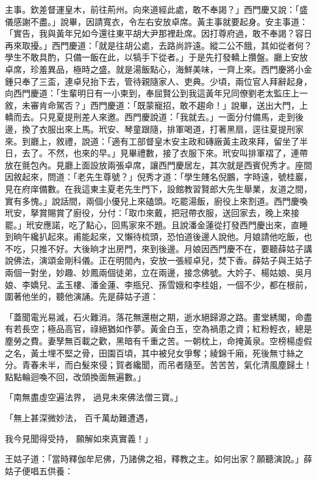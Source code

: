 \begin{showcontents}{}
主事。欽差督運皇木，前往荊州。向來道經此處，敢不奉謁？」西門慶又說：「盛儀感謝不盡。」說畢，因請寬衣，令左右安放卓席。黃主事就要起身。安主事道：「實告，我與黃年兄如今還往東平胡大尹那裡赴席。因打尊府過，敢不奉謁？容日再來取擾。」西門慶道：「就是往胡公處，去路尚許遠。縱二公不餓，其如從者何？學生不敢具酌，只備一飯在此，以犒手下從者。」于是先打發轎上攢盤。廳上安放卓席，珍羞異品，極時之盛。就是湯飯點心，海鮮美味，一齊上來。西門慶將小金鍾只奉了三盃，連卓兒抬下去，管待親隨家人、吏典。少頃，兩位官人拜辭起身，向西門慶道：「生輩明日有一小柬到，奉屈賢公到我這黃年兄同僚劉老太監庄上一敘，未審肯命駕否？」西門慶道：「既蒙寵招，敢不趨命！」說畢，送出大門，上轎而去。只見夏提刑差人來邀。西門慶說道：「我就去。」一面分付備馬，走到後邊，換了衣服出來上馬。玳安、琴童跟隨，排軍喝道，打著黑扇，逕往夏提刑家來。到廳上，敘禮，說道：「適有工部督皇木安主政和磚廠黃主政來拜，留坐了半日，去了。不然，也來的早。」見畢禮數，接了衣服下來。玳安叫排軍褶了，連帶放在氈包內。見廳上面設放兩張卓席，讓西門慶居左，其次就是西賓倪秀才。座間因敘起來，問道：「老先生尊號？」倪秀才道：「學生賤名倪鵬，字時遠，號桂巖，見在府庠備數。在我這東主夏老先生門下，設館教習賢郎大先生舉業，友道之間，實有多愧。」說話間，兩個小優兒上來磕頭。吃罷湯飯，廚役上來割道。西門慶喚玳安，拏賞賜賞了廚役，分付：「取巾來戴，把冠帶衣服，送回家去，晚上來接罷。」玳安應諾，吃了點心，回馬家來不題。且說潘金蓮從打發西門慶出來，直睡到晌午纔扒起來。甫能起來，又懶待梳頭，恐怕道後邊人說他。月娘請他吃飯，也不吃，只推不好。大後晌才出房門，來到後邊。月娘因西門慶不在，要聽薛姑子講說佛法，演頌金剛科儀。正在明間內，安放一張經卓兒，焚下香。薛姑子與王姑子兩個一對坐，妙趣、妙鳳兩個徒弟，立在兩邊，接念佛號。大妗子、楊姑娘、吳月娘、李嬌兒、孟玉樓、潘金蓮、李瓶兒、孫雪娥和李桂姐，一個不少，都在根前，圍著他坐的，聽他演誦。先是薛姑子道：

「蓋聞電光易滅，石火難消。落花無還樹之期，逝水絕歸源之路。畫堂綉閣，命盡有若長空；極品高官，祿絕猶如作夢。黃金白玉，空為禍患之資；紅粉輕衣，總是塵勞之費。妻孥無百載之歡，黑暗有千重之苦。一朝枕上，命掩黃泉。空榜楊虛假之名，黃土埋不堅之骨，田園百頃，其中被兒女爭奪；綾錦千廂，死後無寸絲之分。青春未半，而白髮來侵；賀者纔聞，而吊者隨至。苦苦苦，氣化清風塵歸土！點點輪迴喚不回，改頭換面無遍數。」

「南無盡虛空遍法界，  過見未來佛法僧三寶。」

「無上甚深微妙法，  百千萬劫難遭遇，

我今見聞得受持，  願解如來真實義！」

王姑子道：「當時釋伽牟尼佛，乃諸佛之祖，釋教之主。如何出家？願聽演說。」薛姑子便唱五供養：


\end{showcontents}
